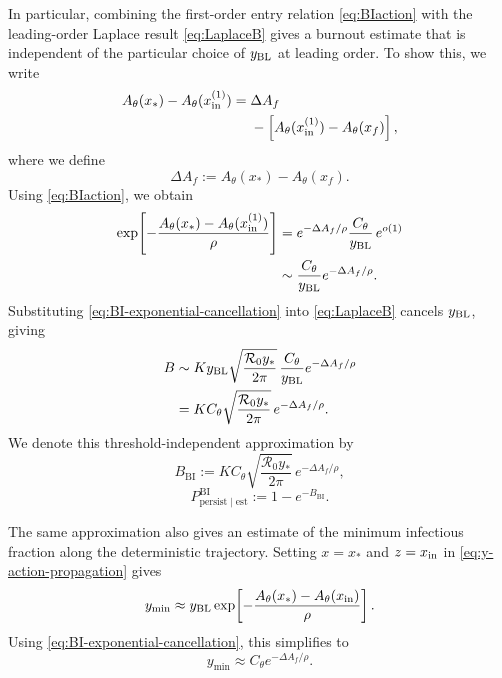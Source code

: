\documentclass[11pt]{article}
\newcommand{\Rzero}{\mathcal R_0}
\newcommand{\rhoeps}{\rho}
\newcommand{\xf}{x_f}
\newcommand{\xs}{x_*}
\newcommand{\yin}{y_{\rm BL}}
\newcommand{\xin}{x_{\rm in}}
\newcommand{\Cth}{C_\theta}
\newcommand{\Ath}{A_\theta}
\newcommand{\dAf}{\Delta A_f}
\newcommand{\BI}{\mathrm{BI}}
\newcommand{\est}{\mathrm{est}}
\newcommand{\persist}{\mathrm{persist}}
\begin{document}
In particular, combining the first-order entry relation \cref{eq:BIaction} with the leading-order Laplace result \cref{eq:LaplaceB} gives a burnout estimate that is independent of the particular choice of \(\yin\) at leading order. To show this, we write
\begin{equation}
\begin{aligned}
\Ath(\xs)-\Ath(x_{\rm in}^{(1)})
={}&\dAf\\
&-\left[\Ath(x_{\rm in}^{(1)})-\Ath(\xf)\right],
\end{aligned}
\label{eq:BI-action-split}
\end{equation}
where we define
\begin{equation}
\dAf:=\Ath(\xs)-\Ath(\xf).
\label{eq:action-barrier}
\end{equation}
Using \cref{eq:BIaction}, we obtain
\begin{equation}
\begin{aligned}
\exp\!\left[-\frac{\Ath(\xs)-\Ath(x_{\rm in}^{(1)})}{\rhoeps}\right]
&=e^{-\dAf/\rhoeps}\frac{\Cth}{\yin}\,e^{o(1)}\\
&\sim\frac{\Cth}{\yin}e^{-\dAf/\rhoeps}.
\end{aligned}
\label{eq:BI-exponential-cancellation}
\end{equation}
Substituting \cref{eq:BI-exponential-cancellation} into \cref{eq:LaplaceB} cancels \(\yin\), giving
\begin{equation}
\begin{aligned}
B&\sim K\yin\sqrt{\frac{\Rzero y_*}{2\pi}}\,
\frac{\Cth}{\yin}e^{-\dAf/\rhoeps}\\
&=K\Cth\sqrt{\frac{\Rzero y_*}{2\pi}}\,e^{-\dAf/\rhoeps}.
\end{aligned}
\label{eq:BI-B-cancellation}
\end{equation}
We denote this threshold-independent approximation by
\begin{equation}
B_{\BI}:=K\Cth\sqrt{\frac{\Rzero y_*}{2\pi}}\,e^{-\dAf/\rhoeps},
\label{eq:BBI}
\end{equation}
\begin{equation}
P_{\persist\mid\est}^{\BI}:=1-e^{-B_{\BI}}.
\label{eq:PBI}
\end{equation}

The same approximation also gives an estimate of the minimum infectious fraction along the deterministic trajectory. Setting \(x=\xs\) and \(z=\xin\) in \cref{eq:y-action-propagation} gives
\begin{equation}
y_{\min}\approx\yin
\exp\!\left[-\frac{\Ath(\xs)-\Ath(\xin)}{\rhoeps}\right].
\label{eq:yminentry}
\end{equation}
Using \cref{eq:BI-exponential-cancellation}, this simplifies to
\begin{equation}
y_{\min}\approx\Cth e^{-\dAf/\rhoeps}.
\label{eq:yminBI}
\end{equation}
\end{document}
